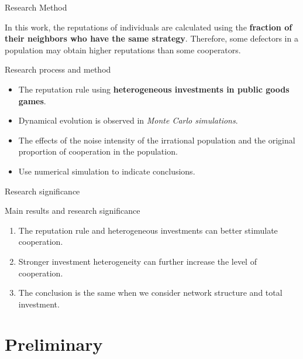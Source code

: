 \documentclass[notheorems,11pt,compress]{beamer}
\numberwithin{figure}{section}
\numberwithin{table}{section}
\numberwithin{equation}{section}
\theoremstyle{plain}
\numberwithin{theorem}{section}
\numberwithin{definition}{section}
\numberwithin{lemma}{section}
\numberwithin{proposition}{section}
\numberwithin{corollary}{section}
\theoremstyle{example}
\begin{document}

\begin{frame}{Research Method}

	In this work, the reputations of individuals are calculated using the \textbf{fraction of their neighbors who have the same strategy}. Therefore, some defectors in a population may obtain higher reputations than some cooperators.

	\begin{exampleblock}{Research process and method}
		\begin{itemize}
			\item The reputation rule using \textbf{heterogeneous investments in public goods games}.
			\item Dynamical evolution is observed in \textit{Monte Carlo simulations}.
			\item The effects of the noise intensity of the irrational population and the original proportion of cooperation in the population.
			\item Use numerical simulation to indicate conclusions.
		\end{itemize}
	\end{exampleblock}

\end{frame}


\begin{frame}{Research significance}


	\begin{alertblock}{Main results and research significance}
		\begin{enumerate}
			\item The reputation rule and heterogeneous investments can better stimulate cooperation.
			      \vspace*{1ex}
			\item Stronger investment heterogeneity can further increase the level of cooperation.
			      \vspace*{1ex}
			\item The conclusion is the same when we consider network structure and total investment.
		\end{enumerate}
	\end{alertblock}


\end{frame}

\section{Preliminary}
\end{document}
